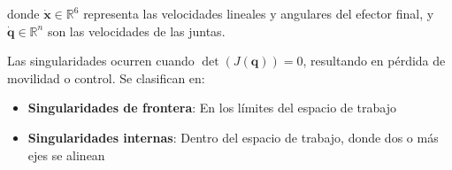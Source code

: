 donde $\dot{\mathbf{x}} \in \mathbb{R}^6$ representa las velocidades lineales y angulares del efector final, y $\dot{\mathbf{q}} \in \mathbb{R}^n$ son las velocidades de las juntas.

Las singularidades ocurren cuando $\det(J(\mathbf{q})) = 0$, resultando en pérdida de movilidad o control. Se clasifican en:

\begin{itemize}
    \item \textbf{Singularidades de frontera}: En los límites del espacio de trabajo
    \item \textbf{Singularidades internas}: Dentro del espacio de trabajo, donde dos o más ejes se alinean
\end{itemize}










